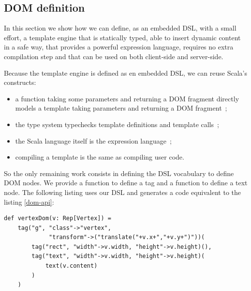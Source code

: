 \documentclass[american,english,runningheads]{llncs}
\begin{document}


\subsection{DOM definition}

In this section we show how we can define, as an embedded DSL, with a small effort, a template engine that is
statically typed, able to insert dynamic content in a safe way, that provides a powerful expression language,
requires no extra compilation step and that can be used on both client-side and server-side.

Because the template engine is defined as en embedded DSL, we can reuse Scala’s constructs:

\begin{itemize}
\item a function taking some parameters and returning a DOM fragment directly models a template taking parameters and
returning a DOM fragment~;
\item the type system typechecks template definitions and template calls~;
\item the Scala language itself is the expression language~;
\item compiling a template is the same as compiling user code.
\end{itemize}

So the only remaining work consists in defining the DSL vocabulary to define DOM nodes. We provide a 
function to define a tag and a  function to define a text node. The following listing uses our DSL and
generates a code equivalent to the listing \ref{dom-api}:

\begin{lstlisting}[label=forest-hello,caption=DOM definition DSL]
def vertexDom(v: Rep[Vertex]) =
    tag("g", "class"->"vertex",
             "transform"->("translate("+v.x+","+v.y+")"))(
        tag("rect", "width"->v.width, "height"->v.height)(),
        tag("text", "width"->v.width, "height"->v.height)(
            text(v.content)
        )
    )
\end{lstlisting}
\end{document}
